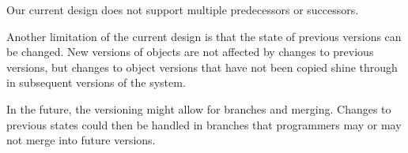 Our current design does not support multiple predecessors or successors.

Another limitation of the current design is that the state of previous versions can be changed.
New versions of objects are not affected by changes to previous versions, but changes to object versions that have not been copied shine through in subsequent versions of the system.

In the future, the versioning might allow for branches and merging.
Changes to previous states could then be handled in branches that programmers may or may not merge into future versions.




















% 

% 
% 
% 
% 
% 













